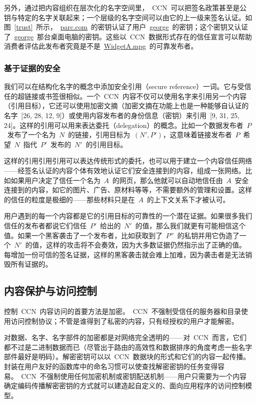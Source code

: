 另外，通过把内容组织在层次化的名字空间里，~CCN~可以把签名政策甚至是公钥与特定的名字关联起来；一个层级的名字空间可以由它的上一级来签名认证。如图~\ref{trust}~所示，~\url{parc.com}~的密钥认证了用户~\url{george}~的密钥；这个密钥又认证了~\url{george}~那台桌面电脑的密钥。这些以~CCN~数据形式存在的信任宣言可以帮助消费者评估此发布者究竟是不是~\url{WidgetA.mpg}~的可靠发布者。

\subsubsection{基于证据的安全}
\label{sec:5.2.2}
我们可以在结构化名字的概念中添加安全引用（secure reference）一词。它与受信任的超链接或书签很相似。一个~CCN~内容不仅可以使用名字来引用另一个内容（引用目标），它还可以使用加密文摘（加密文摘在功能上也是一种能够自认证的名字~[26, 28, 12, 9]）或使用内容发布者的身份信息（密钥）来引用~[9, 31, 25, 24]。这样的引用可以用来表达委托（delegation）的概念。比如一个数据发布者~$P$~发布了一个名为~$N$~的链接，引用目标为~$(N' , P')$，这意味着链接发布者~$P$~希望~$N$~指代~$P'$~发布的~$N'$~的引用目标。

这样的引用引用引用可以表达传统形式的委托，也可以用于建立一个内容信任网络——经签名认证的内容个体有效地认证它们安全连接到的内容，组成一张网络。比如如果用户决定了信任一个名为~$A$~的网页，那么他就可以自动地信任由~$A$~安全连接到的内容，如它的图片、广告、原材料等等，不需要额外的管理和设置。这样的信任的粒度是极细的——那些材料只是在~$A$~的上下文关系下才被认可。

用户遇到的每一个内容都是它的引用目标的可靠性的一个潜在证据。如果很多我们信任的发布者都说它们信任~$P'$~给出的~$N'$~的值，那么我们就更有可能相信这个值。如果一个黑客袭击了一个发布者，比如获取到了~$P''$~的私钥并用它伪造了一个~$N'$~的值，这样的攻击将不会奏效，因为大多数证据仍然指示出了正确的值。每增加一份可信的签名证据，这样的黑客袭击就会难上加难，因为袭击者是无法销毁所有证据的。

\subsection{内容保护与访问控制}
\label{sec:5.3}
控制~CCN~内容访问的首要方法是加密。~CCN~不强制受信任的服务器和目录使用访问控制协议；不管是谁得到了私密的内容，只有经授权的用户才能解密。

对数据、名字、名字部件的加密都是对网络完全透明的——对~CCN~而言，它们都不过是二进制数据而已（尽管出于路由的高效性和数据排序的角度考虑一些名字部件最好是明码）。解密密钥可以以~CCN~数据块的形式和它们的内容一起传播。封装在用户友好的函数库中的命名习惯可以使查找解密密钥的任务变得容易。~CCN~不强制使用任何加密机制或密钥配送机制——用户只需要为一个内容确定编码传播解密密钥的方式就可以建造起自定义的、面向应用程序的访问控制模型。

